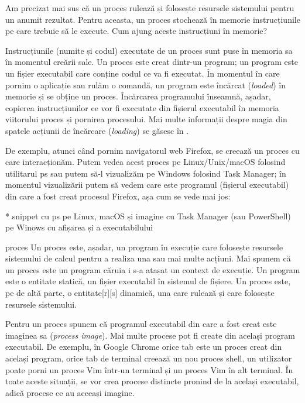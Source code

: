 Am precizat mai sus că un proces rulează și folosește resursele sistemului
pentru un anumit rezultat. Pentru aceasta, un proces stochează în memorie
instrucțiunile pe care trebuie să le execute. Cum ajung aceste instrucțiuni în
memorie?

Instrucțiunile (numite și codul) executate de un proces sunt puse în memoria sa
în momentul creării sale. Un proces este creat dintr-un program; un program este
un fișier executabil care conține codul ce va fi executat. În momentul în care
pornim o aplicație sau rulăm o comandă, un program este încărcat
(\textit{loaded}) în memorie și se obține un proces. Încărcarea programului
înseamnă, așadar, copierea instrucțiunilor ce vor fi executate din fișierul
executabil în memoria viitorului proces și pornirea procesului. Mai multe
informații despre magia din spatele acțiunii de încărcare (\textit{loading}) se
găsesc în .

De exemplu, atunci când pornim navigatorul web Firefox, se creează un proces cu
care interacționăm. Putem vedea acest proces pe Linux/Unix/macOS folosind
utilitarul ps sau putem să-l vizualizăm pe Windows folosind Task Manager; în
momentul vizualizării putem să vedem care este programul (fișierul executabil)
din care a fost creat procesul Firefox, așa cum se vede mai jos:

* snippet cu ps pe Linux, macOS și imagine cu Task Manager (sau PowerShell) pe Winows cu afișarea și a executabilului

\begin{definition}{proces}
	Un proces este, așadar, un program în execuție care folosește resursele
	sistemului de calcul pentru a realiza una sau mai multe acțiuni. Mai
	spunem că un proces este un program căruia i s-a atașat un context de
	execuție. Un program este o entitate statică, un fișier executabil în
	sistemul de fișiere. Un proces este, pe de altă parte, o entitate[r][s]
	dinamică, una care rulează și care folosește resursele sistemului.
\end{definition}

Pentru un proces spunem că programul executabil din care a fost creat este
imaginea sa (\textit{process image}). Mai multe procese pot fi create din același program
executabil. De exemplu, în Google Chrome orice tab este un proces creat din
același program, orice tab de terminal creează un nou proces shell, un
utilizator poate porni un proces Vim într-un terminal și un proces Vim în alt
terminal. În toate aceste situații, se vor crea procese distincte pronind de la
același executabil, adică procese ce au aceeași imagine.

